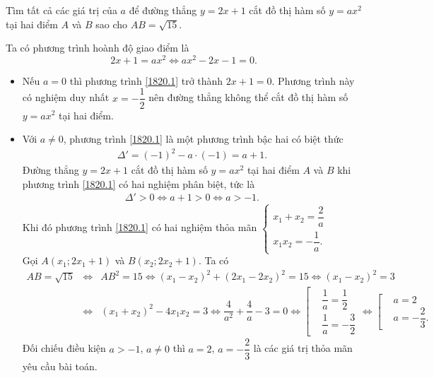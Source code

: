 \begin{ex}%
 Tìm tất cả các giá trị của $a$ để đường thẳng $y=2x+1$ cắt đồ thị hàm số $y=ax^2$ tại hai điểm $A$ và $B$ sao cho $AB=\sqrt{15}$.
 \loigiai
  {
  Ta có phương trình hoành độ giao điểm là
  \begin{equation}\label{1820.1}
   2x+1=ax^2 \Leftrightarrow ax^2-2x-1=0.
  \end{equation}
  \begin{itemize}
   \item Nếu $a=0$ thì phương trình \eqref{1820.1} trở thành $2x+1=0$. Phương trình này có nghiệm duy nhất $x=-\dfrac{1}{2}$ nên đường thẳng không thể cắt đồ thị hàm số $y=ax^2$ tại hai điểm.
   \item Với $a\neq 0$, phương trình \eqref{1820.1} là một phương trình bậc hai có biệt thức
   \begin{eqnarray*}
    \Delta'=(-1)^2-a\cdot (-1) = a+1.
   \end{eqnarray*}
   Đường thẳng $y=2x+1$ cắt đồ thị hàm số $y=ax^2$ tại hai điểm $A$ và $B$ khi phương trình \eqref{1820.1} có hai nghiệm phân biệt, tức là
   \begin{eqnarray*}
    \Delta'>0 \Leftrightarrow a+1>0 \Leftrightarrow a>-1.
   \end{eqnarray*}
   Khi đó phương trình \eqref{1820.1} có hai nghiệm thỏa mãn $\begin{cases}x_1+x_2=\dfrac{2}{a} \\x_1x_2=-\dfrac{1}{a}.\end{cases}$\\
   Gọi $A(x_1;2x_1+1)$ và $B(x_2;2x_2+1)$. Ta có
   \allowdisplaybreaks
   \begin{eqnarray*}
    AB=\sqrt{15} &\Leftrightarrow& AB^2=15 \Leftrightarrow (x_1-x_2)^2+(2x_1-2x_2)^2=15 \Leftrightarrow (x_1-x_2)^2=3\\
    &\Leftrightarrow& (x_1+x_2)^2-4x_1x_2=3 \Leftrightarrow \dfrac{4}{a^2} + \dfrac{4}{a} - 3 = 0 \Leftrightarrow \left[\begin{aligned}&\dfrac{1}{a}=\dfrac{1}{2} \\&\dfrac{1}{a}=-\dfrac{3}{2} \end{aligned} \right. \Leftrightarrow \left[\begin{aligned}&a=2 \\&a=-\dfrac{2}{3}. \end{aligned} \right.
   \end{eqnarray*}
   Đối chiếu điều kiện $a>-1$, $a\neq 0$ thì $a=2$, $a=-\dfrac{2}{3}$ là các giá trị thỏa mãn yêu cầu bài toán.
  \end{itemize}
  }
\end{ex}

